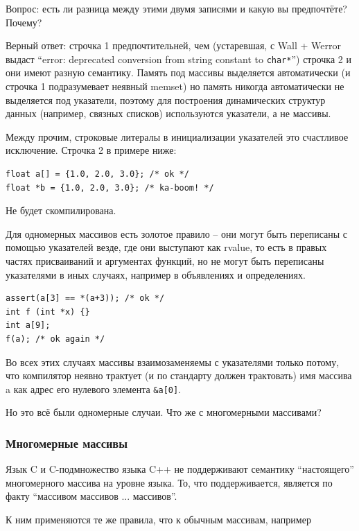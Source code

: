 \documentclass[a4paper,12pt,oneside]{article}
\begin{document}
Вопрос: есть ли разница между этими двумя записями и какую вы предпочтёте? Почему?

Верный ответ: строчка 1 предпочтительней, чем (устаревшая, с Wall + Werror выдаст ``error: deprecated conversion from string constant to \lstinline!char*!'') строчка 2 и они имеют разную семантику. Память под массивы выделяется автоматически (и строчка 1 подразумевает неявный memset) но память никогда автоматически не выделяется под указатели, поэтому для построения динамических структур данных (например, связных списков) используются указатели, а не массивы.

Между прочим, строковые литералы в инициализации указателей это счастливое исключение. Строчка 2 в примере ниже:

\begin{lstlisting}
float a[] = {1.0, 2.0, 3.0}; /* ok */
float *b = {1.0, 2.0, 3.0}; /* ka-boom! */
\end{lstlisting}

Не будет скомпилирована.

Для одномерных массивов есть золотое правило – они могут быть переписаны с помощью указателей везде, где они выступают как rvalue, то есть в правых частях присваиваний и аргументах функций, но не могут быть переписаны указателями в иных случаях, например в объявлениях и определениях.

\begin{lstlisting}
assert(a[3] == *(a+3)); /* ok */
int f (int *x) {}
int a[9];
f(a); /* ok again */
\end{lstlisting}

Во всех этих случаях массивы взаимозаменяемы с указателями только потому, что компилятор неявно трактует (и по стандарту должен трактовать) имя массива a как адрес его нулевого элемента \lstinline!&a[0]!. 

Но это всё были одномерные случаи. Что же с многомерными массивами?

\subsubsection{Многомерные массивы}

Язык C и C-подмножество языка C++ не поддерживают семантику ``настоящего'' многомерного массива на уровне языка.  То, что поддерживается, является по факту ``массивом массивов ... массивов''. 

К ним применяются те же правила, что к обычным массивам, например
\end{document}
